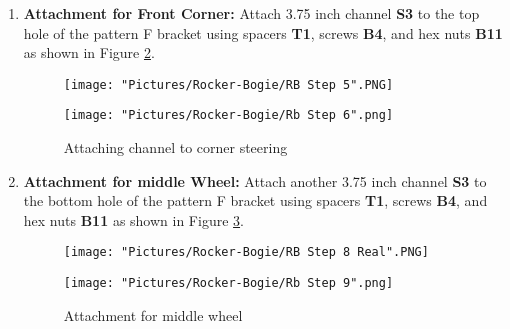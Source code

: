 \documentclass[12pt]{article}
\begin{document}
\begin{enumerate}
\begin{figure}[H]
  \centering
  \begin{minipage}[b]{0.45\textwidth}
    \texttt{[image: "Pictures/Rocker-Bogie/RB Step 3".PNG]}
  \end{minipage}
  \hfill
  \begin{minipage}[b]{0.45\textwidth}
    \texttt{[image: "Pictures/Rocker-Bogie/RB Step 4".PNG]}
  \end{minipage}
  \caption{Start Rocker-Bogie pivot joint}
  \label{RB2}
\end{figure}




\item \textbf{Attachment for Front Corner:} Attach 3.75 inch channel \textbf{S3} to the top hole of the pattern F bracket using spacers \textbf{T1}, screws \textbf{B4}, and hex nuts \textbf{B11} as shown in Figure \ref{attaching channel corner}. 

\begin{figure}[H]
  \centering
  \begin{minipage}[b]{0.45\textwidth}
    \texttt{[image: "Pictures/Rocker-Bogie/RB Step 5".PNG]}
  \end{minipage}
  \hfill
  \begin{minipage}[b]{0.45\textwidth}
    \texttt{[image: "Pictures/Rocker-Bogie/Rb Step 6".png]}
  \end{minipage}
  \caption{Attaching channel to corner steering}
  \label{attaching channel corner}
\end{figure}


\item \textbf{Attachment for middle Wheel:} Attach another 3.75 inch channel \textbf{S3} to the bottom hole of the pattern F bracket using spacers \textbf{T1}, screws \textbf{B4}, and hex nuts \textbf{B11} as shown in Figure \ref{attaching middle wheel}. 

\begin{figure}[H]
  \centering
  \begin{minipage}[b]{0.45\textwidth}
    \texttt{[image: "Pictures/Rocker-Bogie/RB Step 8 Real".PNG]}
  \end{minipage}
  \hfill
  \begin{minipage}[b]{0.45\textwidth}
    \texttt{[image: "Pictures/Rocker-Bogie/Rb Step 9".png]}
  \end{minipage}
  \caption{Attachment for middle wheel}
  \label{attaching middle wheel}
\end{figure}
 


\end{enumerate}
\end{document}
